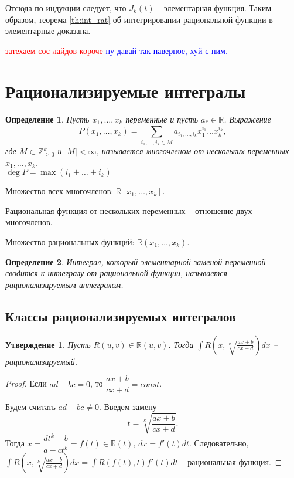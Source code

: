 \documentclass{article}
\theoremstyle{plain}
\newtheorem{claim}{Утверждение}
\newtheorem{definition}{Определение}
\theoremstyle{definition}
\theoremstyle{remark}
\renewcommand{\*}{\cdot}
\begin{document}
Отсюда по индукции следует, что $J_k(t)$ -- элементарная функция. Таким образом, теорема \ref{th:int_rat} об интегрировании рациональной функции в элементарные доказана.

\textcolor{red}{затехаем сос лайдов короче}
\textcolor{blue}{ну давай так наверное, хуй с ним.}



\section{Рационализируемые интегралы}
\begin{definition}
Пусть $x_1, \ldots, x_k$ переменные и пусть $a_{*} \in\mathbb{R}$. Выражение $$P(x_1, \ldots, x_k) = \sum_{i_1, \ldots, i_k \in M} a_{i_1, \ldots, i_k}x_1^{i_1} \ldots x_k^{i_k},$$ где $M\subset \mathbb{Z}_{\geq 0}^{k}$ и $|M| < \infty$, называется многочленом от нескольких переменных $x_1, \ldots, x_k$.\\

\noindent $\deg P= \max(i_1+ \ldots + i_k)$
\end{definition}
\noindent Множество всех многочленов: $\mathbb{R}[x_1, \ldots, x_k]$.

\noindent Рациональная функция от нескольких переменных -- отношение двух многочленов.

\noindent Множество рациональных функций: $\mathbb{R}(x_1, \ldots, x_k)$.

\begin{definition}
Интеграл, который элементарной заменой переменной сводится к интегралу от рациональной функции, называется рационализируемым интегралом.
\end{definition}

\subsection{Классы рационализируемых интегралов}
\begin{claim}\label{cl:rat_root}
Пусть $R(u, v) \in\mathbb{R}(u, v)$. Тогда $\displaystyle \int R\left(x, \sqrt[k]{\frac{ax+b}{cx+d}}\right)dx$ -- рационализируемый.
\end{claim}
\begin{proof}
Если $ad-bc=0$, то $\dfrac{ax+b}{cx+d}=const$.

Будем считать $ad-bc\neq 0$. Введем замену $$t = \sqrt[k]{\dfrac{ax+b}{cx+d}}.$$ Тогда $x = \dfrac{dt^k-b}{a-ct^k}=f(t)\in\mathbb{R}(t)$, $dx=f'(t)dt$. Следовательно, $\displaystyle \int R\left(x, \sqrt[k]{\frac{ax+b}{cx+d}}\right)dx = \int R(f(t),t)f'(t)dt$ -- рациональная функция.
\end{proof}
\end{document}
